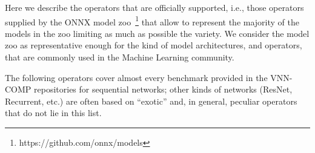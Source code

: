Here we describe the operators that are officially supported, i.e.,
those operators supplied by the ONNX model 
zoo~\footnote{https://github.com/onnx/models} that allow to represent
the majority of the models in the zoo limiting as much as possible the
variety. We consider the model zoo as representative enough for the 
kind of model architectures, and operators, that are commonly used in
the Machine Learning community.

The following operators cover almost every benchmark provided in the
VNN-COMP repositories for sequential networks; other kinds of networks
(ResNet, Recurrent, etc.) are often based on ``exotic'' and, in general,
peculiar operators that do not lie in this list.


